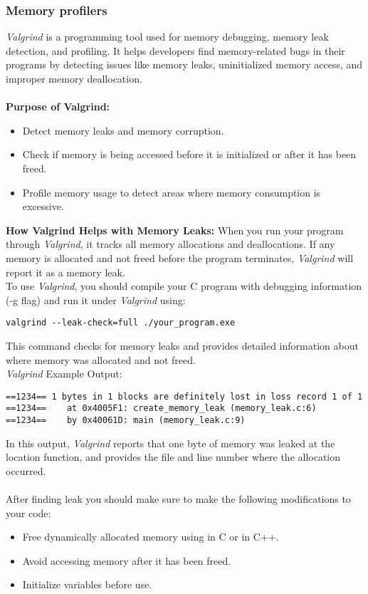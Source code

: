 \documentclass[titlepage]{article}
\begin{document}
\subsubsection{Memory profilers}
\textit{Valgrind} is a programming tool used for memory debugging, memory leak detection, and profiling. It helps developers find memory-related bugs in their programs by detecting issues like memory leaks, uninitialized memory access, and improper memory deallocation.
\\\\\textbf{Purpose of Valgrind:}
\begin{itemize}
\item Detect memory leaks and memory corruption.
\item Check if memory is being accessed before it is initialized or after it has been freed.
\item Profile memory usage to detect areas where memory consumption is excessive.
\end{itemize}
\textbf{How Valgrind Helps with Memory Leaks:}
When you run your program through \textit{Valgrind}, it tracks all memory allocations and deallocations. If any memory is allocated and not freed before the program terminates, \textit{Valgrind} will report it as a memory leak.
\\To use \textit{Valgrind}, you should compile your C program with debugging information (-g flag) and run it under \textit{Valgrind} using:
\begin{adjustwidth}{1cm}{1cm}
\begin{tcolorbox}[codebox]
\begin{lstlisting}[numbers=none]  
valgrind --leak-check=full ./your_program.exe
\end{lstlisting}
\end{tcolorbox}
\end{adjustwidth}
This command checks for memory leaks and provides detailed information about where memory was allocated and not freed.
\\\textit{Valgrind} Example Output:
\begin{tcolorbox}[codebox]
\begin{lstlisting}
==1234== 1 bytes in 1 blocks are definitely lost in loss record 1 of 1
==1234==    at 0x4005F1: create_memory_leak (memory_leak.c:6)
==1234==    by 0x40061D: main (memory_leak.c:9)
\end{lstlisting}
\end{tcolorbox}
\noindent In this output, \textit{Valgrind} reports that one byte of memory was leaked at the location  function, and provides the file and line number where the allocation occurred.
\\\\After finding leak you should make sure to make the following modifications to your code:
\begin{itemize}
\item Free dynamically allocated memory using  in C or  in C++.
\item Avoid accessing memory after it has been freed.
\item Initialize variables before use.
\end{itemize}
\end{document}
